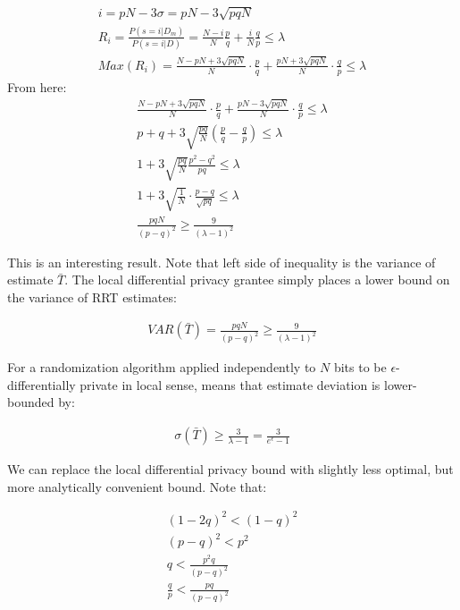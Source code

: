 \documentclass[11pt,draft]{article}
\begin{document}
\begin{align}
i = pN - 3\sigma = pN - 3\sqrt{pqN} \\
R_i = \frac{P(s=i | D_m)}{P(s=i | D)} = \frac{N-i}{N}\frac{p}{q} + \frac{i}{N} \frac{q}{p} \le \lambda \\
Max(R_i) = \frac{N-pN + 3\sqrt{pqN}}{N} \cdot \frac{p}{q} + \frac{pN + 3\sqrt{pqN}}{N} \cdot \frac{q}{p} \le \lambda
\end{align}
From here:
\begin{align}
\frac{N-pN + 3\sqrt{pqN}}{N} \cdot \frac{p}{q} + \frac{pN - 3\sqrt{pqN}}{N} \cdot \frac{q}{p} \le \lambda \\
p + q  +  3\sqrt{\frac{pq}{N}} \left ( \frac{p}{q}  - \frac{q}{p} \right )  \le \lambda \\
1 +  3\sqrt{\frac{pq}{N}} \frac{p^2 - q^2}{pq}  \le \lambda \\
1 + 3\sqrt{\frac{1}{N}}  \cdot \frac{p - q}{\sqrt{pq}}  \le \lambda \\
\frac{pqN}{(p-q)^2} \ge \frac{9}{(\lambda - 1)^2}
\end{align}

This is an interesting result. Note that left side of inequality is the variance of estimate $\bar{T}$.  The local differential privacy grantee simply places a lower bound on the variance of RRT estimates:

\begin{align}
VAR(\bar{T}) = \frac{pqN}{(p-q)^2} \ge \frac{9}{(\lambda - 1)^2}
\end{align}

For a randomization algorithm applied independently to $N$ bits to be $\epsilon$-differentially private in local sense, means that estimate deviation is lower-bounded by:

\begin{align}
\sigma(\bar{T})  \ge \frac{3}{\lambda - 1} =  \frac{3}{e^{\epsilon} - 1}
\end{align}

We can replace the local differential privacy bound with slightly less optimal, but more analytically convenient bound. Note that:

\begin{align}
(1-2q)^2 < (1-q)^2 \\
(p-q)^2 < p^2 \\
q < \frac{p^2q}{(p-q)^2} \\
\frac{q}{p} < \frac{pq}{(p-q)^2} \\
\end{align}
\end{document}
